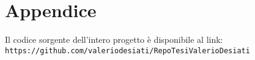\chapter{Appendice}
Il codice sorgente dell'intero progetto è disponibile al link:\\
\texttt{https://github.com/valeriodesiati/RepoTesiValerioDesiati}